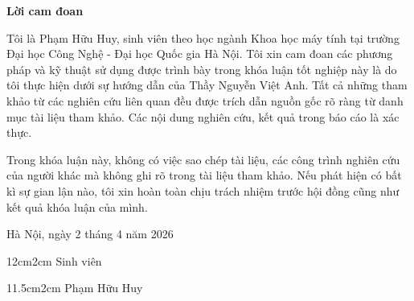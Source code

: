 \setcounter{page}{1}
\begin{center}
\textbf{\large{Lời cam đoan}	}
\end{center}
Tôi là Phạm Hữu Huy, sinh viên theo học ngành Khoa học máy tính tại trường Đại học Công Nghệ - Đại học Quốc gia Hà Nội. Tôi xin cam đoan các phương pháp và kỹ thuật sử dụng được trình bày trong khóa luận tốt nghiệp này là do tôi thực hiện dưới sự hướng dẫn của Thầy Nguyễn Việt Anh. Tất cả những tham khảo từ các nghiên cứu liên quan đều được trích dẫn nguồn gốc rõ ràng từ danh mục tài liệu tham khảo. Các nội dung nghiên cứu, kết quả trong báo cáo là xác thực. 

Trong khóa luận này, không có việc sao chép tài liệu, các công trình nghiên cứu của người khác mà không ghi rõ trong tài liệu tham khảo. Nếu phát hiện có bất kì sự gian lận nào, tôi xin hoàn toàn chịu trách nhiệm trước hội đồng cũng như kết quả khóa luận của mình.

\begin{flushright}
Hà Nội, ngày 2 tháng 4 năm 2026
\end{flushright}

\begin{changemargin}{12cm}{2cm}
Sinh viên
\\[2cm]
\end{changemargin}

\begin{changemargin}{11.5cm}{2cm}
Phạm Hữu Huy
\end{changemargin}